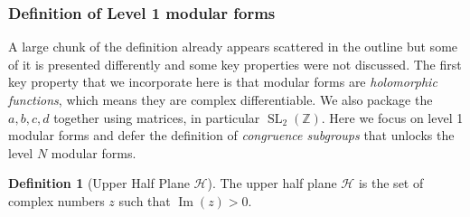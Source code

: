 \documentclass{article}
\theoremstyle{definition}
\newtheorem{definition}{Definition}[section]
\theoremstyle{definition}
\theoremstyle{definition}
\newcommand{\SLZ}{\operatorname{SL}_2(\mathbb{Z})}
\begin{document}
\subsubsection{Definition of Level 1 modular forms}
A large chunk of the definition already appears scattered in the outline but some of it is presented differently and some key properties were not discussed.
\newline\newline
The first key property that we incorporate here is that modular forms are \emph{holomorphic functions}, which means they are complex differentiable.
\newline\newline
We also package the $a,b,c,d$ together using matrices, in particular $\SLZ$.
\newline\newline
Here we focus on level 1 modular forms and defer the definition of \emph{congruence subgroups} that unlocks the level $N$ modular forms.

\begin{definition}[Upper Half Plane $\mathcal{H}$]
The upper half plane $\mathcal{H}$ is the set of complex numbers $z$ such that $\operatorname{Im}(z)>0$.
\end{definition}
\end{document}
